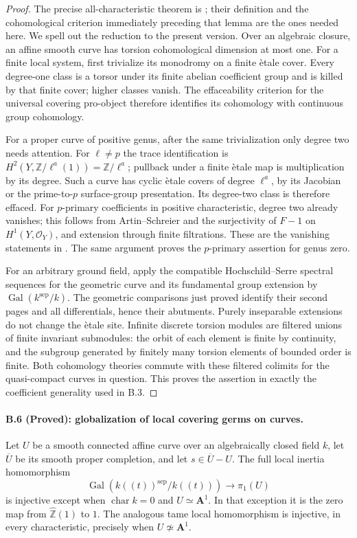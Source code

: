 \begin{proof}
The precise all-characteristic theorem is
\citet[Lemma 2.7(a)]{SchmidtStix2016}; their definition and the
cohomological criterion immediately preceding that lemma are the
ones needed here. We spell out the reduction to the present version.
Over an algebraic closure, an affine smooth curve has torsion
cohomological dimension at most one. For a finite local system,
first trivialize its monodromy on a finite \`etale cover. Every
degree-one class is a torsor under its finite abelian coefficient
group and is killed by that finite cover; higher classes vanish.
The effaceability criterion for the universal covering pro-object
therefore identifies its cohomology with continuous group cohomology.

For a proper curve of positive genus, after the same trivialization
only degree two needs attention. For $\ell\ne p$ the trace
identification is $H^2(Y,\mathbb Z/\ell^a(1))=\mathbb Z/\ell^a$;
pullback under a finite \`etale map is multiplication by its degree.
Such a curve has cyclic \`etale covers of degree $\ell^a$, by its
Jacobian or the prime-to-$p$ surface-group presentation. Its degree-two
class is therefore effaced. For $p$-primary coefficients in positive
characteristic, degree two already vanishes; this follows from
Artin--Schreier and the surjectivity of $F-1$ on $H^1(Y,\mathcal O_Y)$,
and extension through finite filtrations. These are the vanishing
statements in \citep[Tags 0A3J and 03SB]{StacksAS,StacksCurves}.
The same argument proves the $p$-primary assertion for genus zero.

For an arbitrary ground field, apply the compatible
Hochschild--Serre spectral sequences for the geometric curve and its
fundamental group extension by $\operatorname{Gal}(k^{\mathrm{sep}}/k)$.
The geometric comparisons just proved identify their second pages
and all differentials, hence their abutments. Purely inseparable
extensions do not change the \`etale site. Infinite discrete torsion
modules are filtered unions of finite invariant submodules: the orbit
of each element is finite by continuity, and the subgroup generated
by finitely many torsion elements of bounded order is finite.
Both cohomology theories commute with these filtered colimits for
the quasi-compact curves in question. This proves the assertion in
exactly the coefficient generality used in B.3.
\end{proof}

\paragraph{B.6 (Proved): globalization of local covering germs on curves.}\label{B6}
Let $U$ be a smooth connected affine curve over an algebraically
closed field $k$, let $\overline U$ be its smooth proper completion,
and let $s\in\overline U-U$. The full local inertia homomorphism
\[
 \operatorname{Gal}(k((t))^{\mathrm{sep}}/k((t)))
 \longrightarrow\pi_1(U)
\]
is injective except when $\operatorname{char}k=0$ and
$U\simeq\mathbf A^1$. In that exception it is the zero map from
$\widehat{\mathbb Z}(1)$ to $1$. The analogous tame local
homomorphism is injective, in every characteristic, precisely when
$U\not\simeq\mathbf A^1$.


